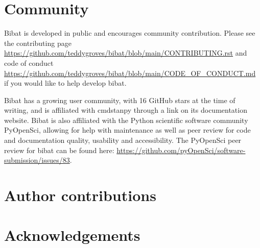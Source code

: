 \documentclass[
  letterpaper,
  DIV=11,
  numbers=noendperiod]{scrartcl}
\begin{document}
\section{Community}\label{community}

Bibat is developed in public and encourages community contribution.
Please see the contributing page
\url{https://github.com/teddygroves/bibat/blob/main/CONTRIBUTING.rst}
and code of conduct
\url{https://github.com/teddygroves/bibat/blob/main/CODE_OF_CONDUCT.md}
if you would like to help develop bibat.

Bibat has a growing user community, with 16 GitHub stars at the time of
writing, and is affiliated with cmdstanpy through a link on its
documentation website. Bibat is also affiliated with the Python
scientific software community PyOpenSci, allowing for help with
maintenance as well as peer review for code and documentation quality,
usability and accessibility. The PyOpenSci peer review for bibat can be
found here:
\url{https://github.com/pyOpenSci/software-submission/issues/83}.

\section{Author contributions}\label{author-contributions}

\section*{Acknowledgements}\label{acknowledgements}
\end{document}
